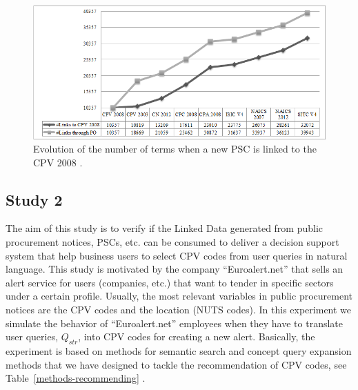  \begin{figure}[!ht]
\centering
	\includegraphics[width=\textwidth]{./imgs/fig-3}
 \caption{Evolution of the number of terms when a new PSC is linked to the CPV 2008 .}
 \label{fig:results-3}
\end{figure}


\subsection{Study 2}
The aim of this study is to verify if the Linked Data generated from public procurement notices, PSCs, etc. can be consumed to deliver a decision 
support system that help business users to select CPV codes from user queries in natural language. This study is motivated by the company ``Euroalert.net'' 
that sells an alert service for users (companies, etc.) that want to tender in specific sectors under a certain profile. 
Usually, the most relevant variables in public procurement notices are the CPV codes and the location (NUTS codes). In this experiment 
we simulate the behavior of ``Euroalert.net'' employees when they have to translate user queries, $Q_{str}$, into CPV codes for creating a new alert. 
Basically, the experiment is based on methods for semantic search and concept query expansion methods that we have designed to 
tackle the recommendation of CPV codes, see Table~\ref{methods-recommending} . 

